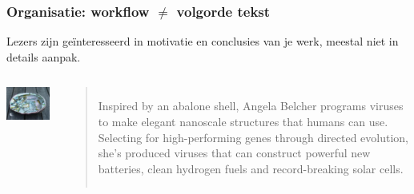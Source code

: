\documentclass[aspectratio=169]{beamer}
\begin{document}
\begin{frame}
  \frametitle{Organisatie: workflow $\ne$ volgorde tekst}

  Lezers zijn geïnteresseerd in motivatie en conclusies van je werk, meestal niet in details aanpak.

  \vfill

  \begin{columns}
    \includegraphics[width=\textwidth]{img/oef2-06}

    \begin{quotation}
      Inspired by an abalone shell, Angela Belcher programs viruses to make elegant nanoscale structures that humans can use. Selecting for high-performing genes through directed evolution, she’s produced viruses that can construct powerful new batteries, clean hydrogen fuels and record-breaking solar cells.
    \end{quotation}
  \end{columns}
\end{frame}
\end{document}
